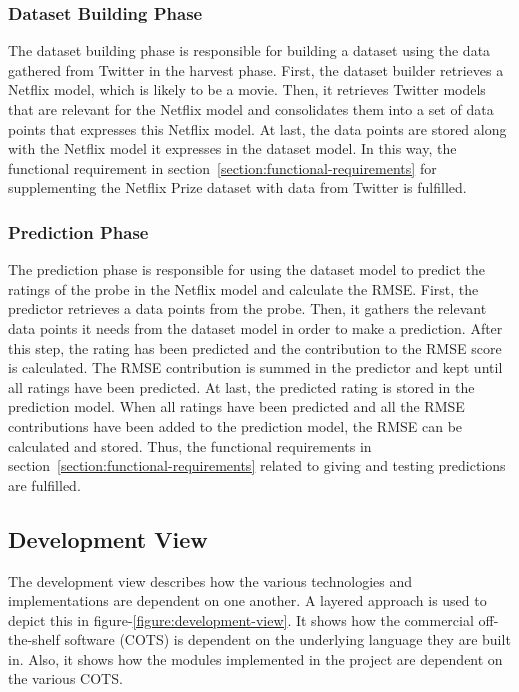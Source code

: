 \subsubsection{Dataset Building Phase}
The dataset building phase is responsible for building a dataset using the data gathered from Twitter in the harvest phase. First, the dataset builder retrieves a Netflix model, which is likely to be a movie. Then, it retrieves Twitter models that are relevant for the Netflix model and consolidates them into a set of data points that expresses this Netflix model. At last, the data points are stored along with the Netflix model it expresses in the dataset model. In this way, the functional requirement in section~\ref{section:functional-requirements} for supplementing the Netflix Prize dataset with data from Twitter is fulfilled.


\subsubsection{Prediction Phase}\label{subsubsec:predict-phase}
The prediction phase is responsible for using the dataset model to predict the ratings of the probe in the Netflix model and calculate the RMSE. First, the predictor retrieves a data points from the probe. Then, it gathers the relevant data points it needs from the dataset model in order to make a prediction. After this step, the rating has been predicted and the contribution to the RMSE score is calculated. The RMSE contribution is summed in the predictor and kept until all ratings have been predicted. At last, the predicted rating is stored in the prediction model. When all ratings have been predicted and all the RMSE contributions have been added to the prediction model, the RMSE can be calculated and stored. Thus, the functional requirements in section~\ref{section:functional-requirements} related to giving and testing predictions are fulfilled.

\subsection{Development View}
The development view describes how the various technologies and implementations are dependent on one another. A layered approach is used to depict this in figure-\ref{figure:development-view}. It shows how the commercial off-the-shelf software (COTS) is dependent on the underlying language they are built in. Also, it shows how the modules implemented in the project are dependent on the various COTS.

